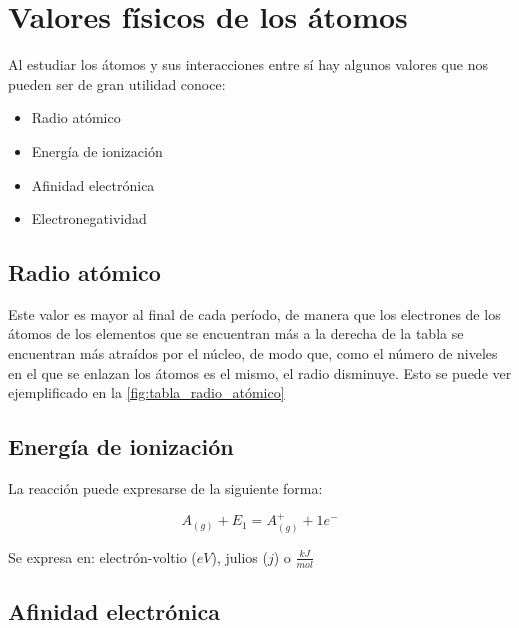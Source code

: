 \section{Valores físicos de los átomos}

Al estudiar los átomos y sus interacciones entre sí hay algunos valores que nos pueden ser de gran utilidad conoce:

\begin{itemize}
    \item Radio atómico
    \item Energía de ionización
    \item Afinidad electrónica
    \item Electronegatividad
\end{itemize}

\subsection{Radio atómico}


Este valor es mayor al final de cada período, de manera que los electrones de los átomos de los elementos que se encuentran más a la derecha de la tabla se encuentran más atraídos por el núcleo, de modo que, como el número de niveles en el que se enlazan los átomos es el mismo, el radio disminuye. Esto se puede ver ejemplificado en la \autoref{fig:tabla_radio_atómico}

\subsection{Energía de ionización}


La reacción puede expresarse de la siguiente forma:

\begin{equation*}
    A_{(g)}  + E_{1} = A^{+}_{(g)} + 1e^{-}
\end{equation*}

Se expresa en: electrón-voltio ($eV$), julios ($j$) o $\frac{kJ}{mol}$

\subsection{Afinidad electrónica}

